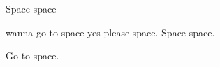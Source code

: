 \documentclass{article}
\begin{document}
Space space \parbox{8em}{wanna go to space yes please space. Space space.} Go to space.
\end{document}
